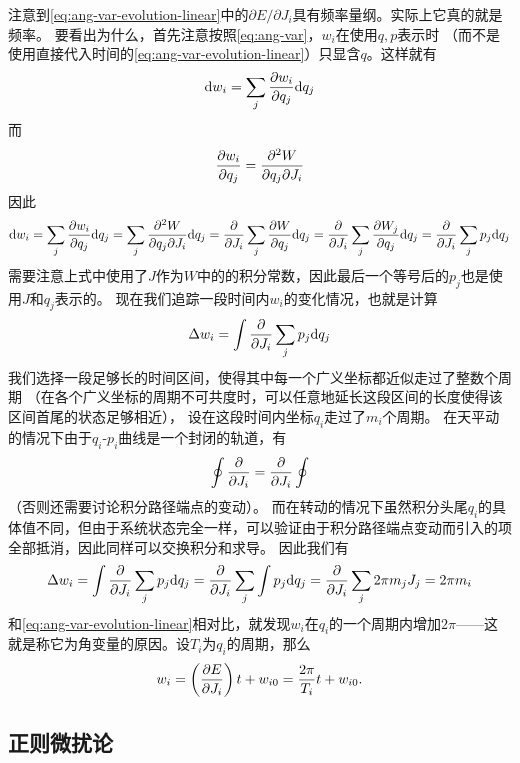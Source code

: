 \documentclass[UTF8, a4paper]{ctexart}
\begin{document}
注意到\eqref{eq:ang-var-evolution-linear}中的$\partial E / \partial J_i$具有频率量纲。实际上它真的就是频率。
要看出为什么，首先注意按照\eqref{eq:ang-var}，$w_i$在使用$q,p$表示时
（而不是使用直接代入时间的\eqref{eq:ang-var-evolution-linear}）只显含$q$。这样就有
\[
    \dd w_i = \sum_j \pdv{w_i}{q_j} \dd q_j
\]
而
\[
    \pdv{w_i}{q_j} = \pdv{W}{q_j}{J_i}
\]
因此
\[
    \dd w_i = \sum_j \pdv{w_i}{q_j} \dd q_j = \sum_j \pdv{W}{q_j}{J_i} \dd q_j = \pdv{J_i} \sum_j \pdv{W}{q_j} \dd q_j = \pdv{J_i} \sum_j \pdv{W_j}{q_j} \dd q_j = \pdv{J_i} \sum_j p_j \dd q_j
\]
需要注意上式中使用了$J$作为$W$中的的积分常数，因此最后一个等号后的$p_j$也是使用$J$和$q_j$表示的。
现在我们追踪一段时间内$w_i$的变化情况，也就是计算
\[
    \Delta w_i = \int \pdv{J_i} \sum_j p_j \dd q_j
\]
我们选择一段足够长的时间区间，使得其中每一个广义坐标都近似走过了整数个周期
（在各个广义坐标的周期不可共度时，可以任意地延长这段区间的长度使得该区间首尾的状态足够相近），
设在这段时间内坐标$q_i$走过了$m_i$个周期。
在天平动的情况下由于$q_i$-$p_i$曲线是一个封闭的轨道，有
\[
    \oint \pdv{J_i} = \pdv{J_i} \oint
\]
（否则还需要讨论积分路径端点的变动）。
而在转动的情况下虽然积分头尾$q_i$的具体值不同，但由于系统状态完全一样，可以验证由于积分路径端点变动而引入的项全部抵消，因此同样可以交换积分和求导。
因此我们有
\[
    \Delta w_i = \int \pdv{J_i} \sum_j p_j \dd q_j = \pdv{J_i} \sum_j \int p_j \dd q_j = \pdv{J_i} \sum_j 2\pi m_j J_j = 2 \pi m_i
\]
和\eqref{eq:ang-var-evolution-linear}相对比，就发现$w_i$在$q_i$的一个周期内增加$2\pi$——这就是称它为角变量的原因。设$T_i$为$q_i$的周期，那么
\begin{equation}
    w_i = \left(\pdv{E}{J_i}\right) t + w_{i0} = \frac{2\pi}{T_i} t + w_{i0}.
    \label{eq:ang-var-evolution}
\end{equation}

\subsection{正则微扰论}
\end{document}
